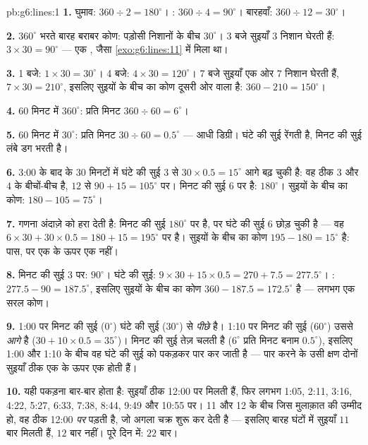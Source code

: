 \begin{solution}{pb:g6:lines:1}
\textbf{1.}  घुमाव: $360 \div 2 = 180^\circ$। :
$360 \div 4 = 90^\circ$। बारहवाँ: $360 \div 12 = 30^\circ$।

\textbf{2.} $360^\circ$ भरते बारह बराबर कोण:
पड़ोसी निशानों के बीच $30^\circ$। 3 बजे सुइयाँ $3$ निशान
घेरती हैं: $3 \times 30 = 90^\circ$ --- एक , जैसा
\cref{exo:g6:lines:11} में मिला था।

\textbf{3.} 1 बजे: $1 \times 30 = 30^\circ$। 4 बजे:
$4 \times 30 = 120^\circ$। 7 बजे सुइयाँ एक ओर $7$ निशान
घेरती हैं, $7 \times 30 = 210^\circ$, इसलिए सुइयों के बीच का
कोण दूसरी ओर वाला है:
$360 - 210 = 150^\circ$।

\textbf{4.} $60$ मिनट में $360^\circ$: प्रति मिनट $360 \div 60 =
6^\circ$।

\textbf{5.} $60$ मिनट में $30^\circ$: प्रति मिनट $30 \div 60 = 0.5^\circ$
--- आधी डिग्री। घंटे की सुई रेंगती है, मिनट की सुई
लंबे डग भरती है।

\textbf{6.} 3:00 के बाद के $30$ मिनटों में घंटे की सुई $3$ से
$30 \times 0.5 = 15^\circ$ आगे बढ़ चुकी है: वह ठीक $3$ और $4$ के
बीचों-बीच है, $12$ से $90 + 15 = 105^\circ$ पर। मिनट की सुई $6$
पर है: $180^\circ$। सुइयों के बीच का कोण:
$180 - 105 = 75^\circ$।

\textbf{7.} गणना अंदाज़े को हरा देती है: मिनट की सुई
$180^\circ$ पर है, पर घंटे की सुई $6$ छोड़ चुकी है --- वह
$6 \times 30 + 30 \times 0.5 = 180 + 15 = 195^\circ$ पर है।
सुइयों के बीच का कोण $195 - 180 = 15^\circ$ है: पास, पर एक के
ऊपर एक नहीं।

\textbf{8.} मिनट की सुई $3$ पर: $90^\circ$। घंटे की सुई:
$9 \times 30 + 15 \times 0.5 = 270 + 7.5 = 277.5^\circ$।
: $277.5 - 90 = 187.5^\circ$, इसलिए सुइयों के बीच का
कोण $360 - 187.5 = 172.5^\circ$ है --- लगभग एक सरल
कोण।

\textbf{9.} 1:00 पर मिनट की सुई ($0^\circ$) घंटे की सुई
($30^\circ$) से \emph{पीछे} है। 1:10 पर मिनट की सुई
($60^\circ$) उससे \emph{आगे} है
($30 + 10 \times 0.5 = 35^\circ$)। मिनट की सुई तेज़ चलती है
($6^\circ$ प्रति मिनट बनाम $0.5^\circ$), इसलिए 1:00 और 1:10 के
बीच वह घंटे की सुई को पकड़कर पार कर जाती है --- पार करने के उसी
क्षण दोनों सुइयाँ ठीक एक के ऊपर एक होती हैं।

\textbf{10.} यही पकड़ना बार-बार होता है: सुइयाँ ठीक 12:00 पर
मिलती हैं, फिर लगभग 1:05, 2:11, 3:16, 4:22, 5:27, 6:33, 7:38,
8:44, 9:49 और 10:55 पर। 11 और 12 के बीच जिस मुलाक़ात की उम्मीद
हो, वह ठीक 12:00 \emph{पर} पड़ती है, जो अगला चक्र शुरू कर देती
है --- इसलिए बारह घंटों में सुइयाँ $11$ बार मिलती हैं, $12$
बार नहीं। पूरे दिन में: $22$ बार।


\end{solution}
